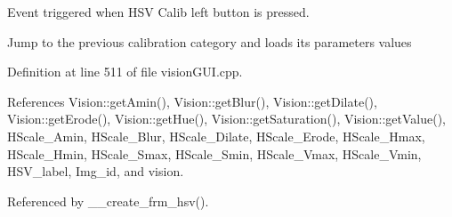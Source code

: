 Event triggered when H\+SV Calib left button is pressed. 

Jump to the previous calibration category and loads its parameters values 

Definition at line 511 of file vision\+G\+U\+I.\+cpp.



References Vision\+::get\+Amin(), Vision\+::get\+Blur(), Vision\+::get\+Dilate(), Vision\+::get\+Erode(), Vision\+::get\+Hue(), Vision\+::get\+Saturation(), Vision\+::get\+Value(), H\+Scale\+\_\+\+Amin, H\+Scale\+\_\+\+Blur, H\+Scale\+\_\+\+Dilate, H\+Scale\+\_\+\+Erode, H\+Scale\+\_\+\+Hmax, H\+Scale\+\_\+\+Hmin, H\+Scale\+\_\+\+Smax, H\+Scale\+\_\+\+Smin, H\+Scale\+\_\+\+Vmax, H\+Scale\+\_\+\+Vmin, H\+S\+V\+\_\+label, Img\+\_\+id, and vision.



Referenced by \+\_\+\+\_\+create\+\_\+frm\+\_\+hsv().


